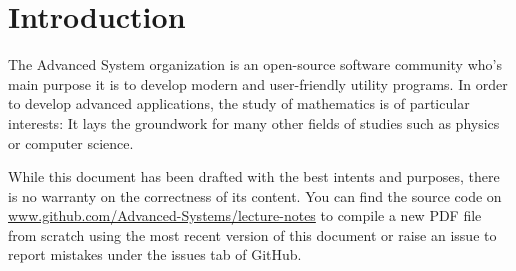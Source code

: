 \section{Introduction}

\begin{flushleft}
	The Advanced System organization is an open-source software community who's main
	purpose it is to develop modern and user-friendly utility programs. In order to
	develop advanced applications, the study of mathematics is of particular interests:
	It lays the groundwork for many other fields of studies such as physics or computer
	science.
\end{flushleft}

\begin{flushleft}
	While this document has been drafted with the best intents and purposes, there
	is no warranty on the correctness of its content. You can find the source code
	on \url{www.github.com/Advanced-Systems/lecture-notes} to compile a new PDF
	file from scratch using the most recent version of this document or raise an
	issue to report mistakes under the issues tab of GitHub.
\end{flushleft}
